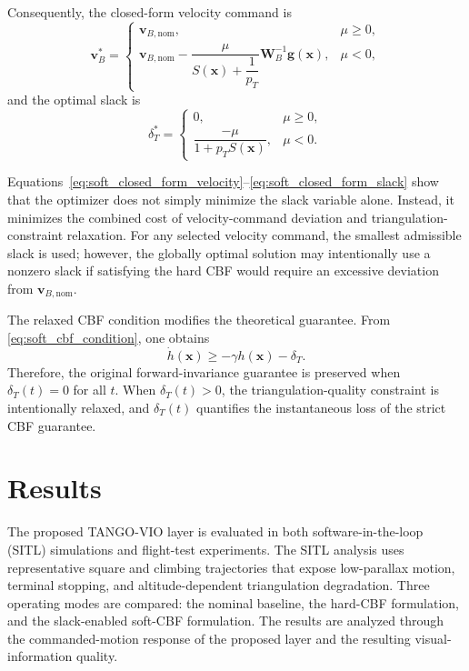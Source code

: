 \documentclass[journal]{IEEEtran}
\begin{document}
Consequently, the closed-form velocity command is
\begin{equation}
  \bm{v}_{B}^{*}
  =
  \begin{cases}
  \bm{v}_{B,\mathrm{nom}},
  & \mu\ge0,\\[8pt]
  \bm{v}_{B,\mathrm{nom}}
  -
  \dfrac{\mu}
  {S(\bm{x})+\dfrac{1}{p_T}}
  \bm{W}_{B}^{-1}\bm{g}(\bm{x}),
  & \mu<0,
  \end{cases}
  \label{eq:soft_closed_form_velocity}
\end{equation}
and the optimal slack is
\begin{equation}
  \delta_T^{*}
  =
  \begin{cases}
  0,
  & \mu\ge0,\\[8pt]
  \dfrac{-\mu}
  {1+p_T S(\bm{x})},
  & \mu<0.
  \end{cases}
  \label{eq:soft_closed_form_slack}
\end{equation}

Equations~\eqref{eq:soft_closed_form_velocity}--\eqref{eq:soft_closed_form_slack} show that the optimizer does not simply minimize the slack variable alone. Instead, it minimizes the combined cost of velocity-command deviation and triangulation-constraint relaxation. For any selected velocity command, the smallest admissible slack is used; however, the globally optimal solution may intentionally use a nonzero slack if satisfying the hard CBF would require an excessive deviation from $\bm{v}_{B,\mathrm{nom}}$. 

The relaxed CBF condition modifies the theoretical guarantee. From \eqref{eq:soft_cbf_condition}, one obtains
\begin{equation}
  \dot{h}(\bm{x})
  \ge
  -\gamma h(\bm{x})-\delta_T.
  \label{eq:soft_cbf_differential_inequality}
\end{equation}
Therefore, the original forward-invariance guarantee is preserved when $\delta_T(t)=0$ for all $t$. When $\delta_T(t)>0$, the triangulation-quality constraint is intentionally relaxed, and $\delta_T(t)$ quantifies the instantaneous loss of the strict CBF guarantee.







\section{Results}
\label{results}

The proposed TANGO-VIO layer is evaluated in both software-in-the-loop (SITL) simulations and flight-test experiments. The SITL analysis uses representative square and climbing trajectories that expose low-parallax motion, terminal stopping, and altitude-dependent triangulation degradation. Three operating modes are compared: the nominal baseline, the hard-CBF formulation, and the slack-enabled soft-CBF formulation. The results are analyzed through the commanded-motion response of the proposed layer and the resulting visual-information quality.
\end{document}

